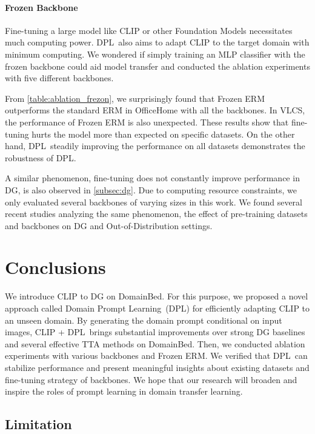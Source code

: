 \documentclass[letterpaper]{article} \usepackage[]{aaai23}
\newcommand{\dplshort}{DPL}
\newcommand{\dpllong}{Domain Prompt Learning}
\begin{document}
\paragraph{Frozen Backbone}
Fine-tuning a large model like CLIP or other Foundation Models necessitates much computing power.
\dplshort~also aims to adapt CLIP to the target domain with minimum computing.
We wondered if simply training an MLP classifier with the frozen backbone could aid model transfer and conducted the ablation experiments with five different backbones.

From \autoref{table:ablation_frezon}, we surprisingly found that Frozen ERM outperforms the standard ERM in OfficeHome with all the backbones. 
In VLCS, the performance of Frozen ERM is also unexpected.
These results show that fine-tuning hurts the model more than expected on specific datasets.
On the other hand, \dplshort~steadily improving the performance on all datasets demonstrates the robustness of \dplshort.

A similar phenomenon, fine-tuning does not constantly improve performance in DG, is also observed in \autoref{subsec:dg}.
Due to computing resource constraints, we only evaluated several backbones of varying sizes in this work.
We found several recent studies analyzing the same phenomenon, the effect of pre-training datasets and backbones on DG and Out-of-Distribution settings\cite{kim2022broad,wenzel2022assaying}.

\section{Conclusions}
We introduce CLIP to DG on DomainBed.
For this purpose, we proposed a novel approach called \dpllong~(\dplshort) for efficiently adapting CLIP to an unseen domain.
By generating the domain prompt conditional on input images, CLIP + \dplshort~brings substantial improvements over strong DG baselines and several effective TTA methods on DomainBed.
Then, we conducted ablation experiments with various backbones and Frozen ERM.
We verified that \dplshort~can stabilize performance and present meaningful insights about existing datasets and fine-tuning strategy of backbones.
We hope that our research will broaden and inspire the roles of prompt learning in domain transfer learning.

\subsection{Limitation}
\label{subsec:limitation}
\end{document}
